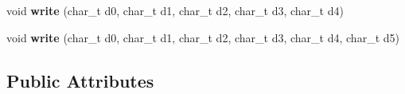 \begin{DoxyCompactItemize}
\item 
\hypertarget{classxml__buffered__writer_aad4a4f18223ec3cb1ff607425119b85f}{void {\bfseries write} (char\-\_\-t d0, char\-\_\-t d1, char\-\_\-t d2, char\-\_\-t d3, char\-\_\-t d4)}\label{classxml__buffered__writer_aad4a4f18223ec3cb1ff607425119b85f}

\item 
\hypertarget{classxml__buffered__writer_ae6af5067d768c24b9c20422f76737f29}{void {\bfseries write} (char\-\_\-t d0, char\-\_\-t d1, char\-\_\-t d2, char\-\_\-t d3, char\-\_\-t d4, char\-\_\-t d5)}\label{classxml__buffered__writer_ae6af5067d768c24b9c20422f76737f29}

\end{DoxyCompactItemize}
\subsection*{Public Attributes}
